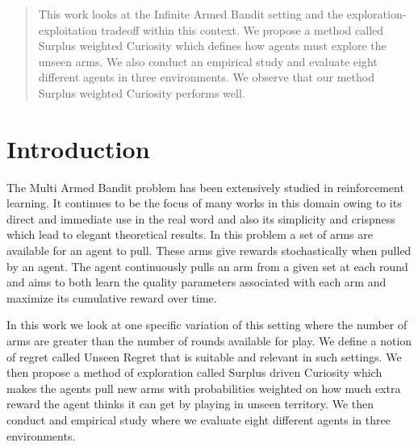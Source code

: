\begin{abstract}
This work looks at the Infinite Armed Bandit setting and the exploration-exploitation tradeoff within this context. We propose a method called Surplus weighted Curiosity which defines how agents must explore the unseen arms. We also conduct an empirical study and evaluate eight different agents in three environments. We observe that our method Surplus weighted Curiosity performs well. 
\end{abstract}

\section{Introduction}

The Multi Armed Bandit problem has been extensively studied in reinforcement learning. It continues to be the focus of many works in this domain owing to its direct and immediate use in the real word and also its simplicity and crispness which lead to elegant theoretical results. In this problem a set of arms are available for an agent to pull. These arms give rewards stochastically when pulled by an agent. The agent continuously pulls an arm from a given set at each round and aims to both learn the quality parameters associated with each arm and maximize its cumulative reward over time.  


In this work we look at one specific variation of this setting where the number of arms are greater than the number of rounds available for play. We define a notion of regret called Unseen Regret that is suitable and relevant in such settings. We then propose a method of exploration called Surplus driven Curiosity which makes the agents pull new arms with probabilities weighted on how much extra reward the agent thinks it can get by playing in unseen territory. We then conduct and empirical study where we evaluate eight different agents in three environments.